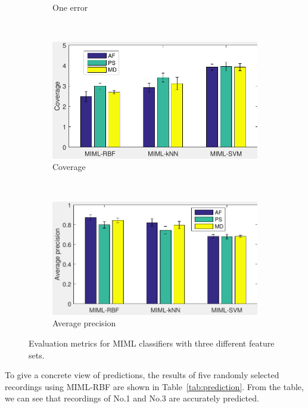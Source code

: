 \begin{figure}[htb!]
\begin{subfigure}[b]{0.45\textwidth}
                \caption{One error}               
        \end{subfigure}  
~
              \begin{subfigure}[b]{0.45\textwidth}
                \includegraphics[width=\textwidth]{image/Ch6/coverage.pdf} 
                \caption{Coverage}                
        \end{subfigure}          
   \\
              \begin{subfigure}[b]{0.45\textwidth}
                \includegraphics[width=\textwidth]{image/Ch6/avgPrecision.pdf}  
                     \caption{Average precision}         
        \end{subfigure}      
\caption{Evaluation metrics for MIML classifiers with three different feature sets.}
        \label{fig:classificationResults}
\end{figure}

To give a concrete view of predictions, the results of five randomly selected recordings using MIML-RBF are shown in Table~\ref{tab:prediction}. From the table, we can see that recordings of No.1 and No.3 are accurately predicted. 

